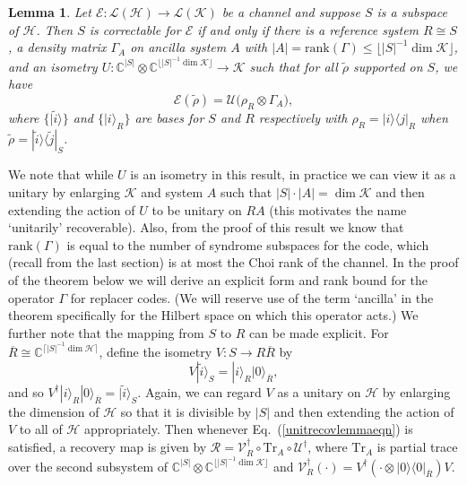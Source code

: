 \documentclass[11pt]{amsart}
\newtheorem{lem}[thm]{Lemma}
\theoremstyle{definition}
\theoremstyle{definition}
\theoremstyle{definition}
\newcommand{\mbb}{\mathbb}
\newcommand{\mc}{\mathcal}
\newcommand{\tr}{\textrm{Tr}}
\newcommand{\op}[2]{|#1\rangle\langle #2|}
\newcommand{\1}{\mathbb{I}}
\def\ket#1{| #1 \rangle}
\begin{document}
\begin{lem}\label{unitrecovlemma}
Let $\mathcal E : \mathcal L(\mathcal H) \rightarrow \mathcal L(\mathcal K)$ be a channel and suppose $S$ is a subspace of $\mathcal H$. Then $S$ is correctable for $\mathcal E$ if and only if there is a reference system $R\cong S$, a density matrix $\Gamma_A$ on ancilla system $A$ with $|A|= \mathrm{rank}(\Gamma) \leq \lfloor |S|^{-1}\dim\mathcal K\rfloor$, and an isometry $U: \mathbb{C}^{|S|}\otimes \mathbb{C}^{\lfloor |S|^{-1}\dim\mathcal K\rfloor} \rightarrow \mathcal K$ such that for all $\widetilde{\rho}$ supported on $S$, we have 
\begin{equation}\label{unitrecovlemmaeqn}
\mathcal E (\widetilde{\rho} ) = \mathcal U \big( \rho_R \otimes \Gamma_A \big), 
\end{equation}
where $\{ \ket{\widetilde{i}}\}$ and $\{ \ket{i}_R \}$ are bases for $S$ and $R$ respectively with $\rho_R = \op{i}{j}_R$ when $\widetilde{\rho} = \op{\widetilde{i}}{\widetilde{j}}_S$. 
\end{lem}

We note that while $U$ is an isometry in this result, in practice we can view it as a unitary by enlarging $\mc{K}$ and system $A$ such that $|S|\cdot |A|=\dim\mc{K}$ and then extending the action of $U$ to be unitary on $RA$ (this motivates the name `unitarily' recoverable). Also, from the proof of this result we know that $\mathrm{rank}(\Gamma)$ is equal to the number of syndrome subspaces for the code, which (recall from the last section) is at most the Choi rank of the channel. In the proof of the theorem below we will derive an explicit form and rank bound for the operator $\Gamma$ for replacer codes. (We will reserve use of the term `ancilla' in the theorem specifically for the Hilbert space on which this operator acts.)  
We further note that the mapping from $S$ to $R$ can be made explicit.  For $\overline{R}\cong \mbb{C}^{\lceil |S|^{-1}\dim\mc{H}\rceil}$, define the isometry $V:S\to R\overline{R}$ by
\begin{equation}
\label{Eq:iso-mapping}
V\ket{\widetilde{i}}_S = \ket{i}_R\ket{0}_{\overline{R}} ,
\end{equation}
and so $V^\dagger\ket{i}_R\ket{0}_{\overline{R}} =\ket{\widetilde{i}}_S$. 
Again, we can regard $V$ as a unitary on $\mc{H}$ by enlarging the dimension of $\mc{H}$ so that it is divisible by $|S|$ and then extending the action of $V$ to all of $\mc{H}$ appropriately.  Then whenever Eq.~(\ref{unitrecovlemmaeqn}) is satisfied,
a recovery map is given by $\mathcal R = \mathcal V_{R}^\dagger \circ \tr_A \circ \mathcal U^\dagger$, where $\tr_A$ is partial trace over the second subsystem of $\mathbb{C}^{|S|}\otimes  \mathbb{C}^{\lfloor |S|^{-1}\dim\mathcal K\rfloor}$ and $\mathcal V_R^\dagger(\cdot) = V^\dagger(\cdot\otimes \op{0}{0}_{\overline{R}})V$. 
\end{document}
